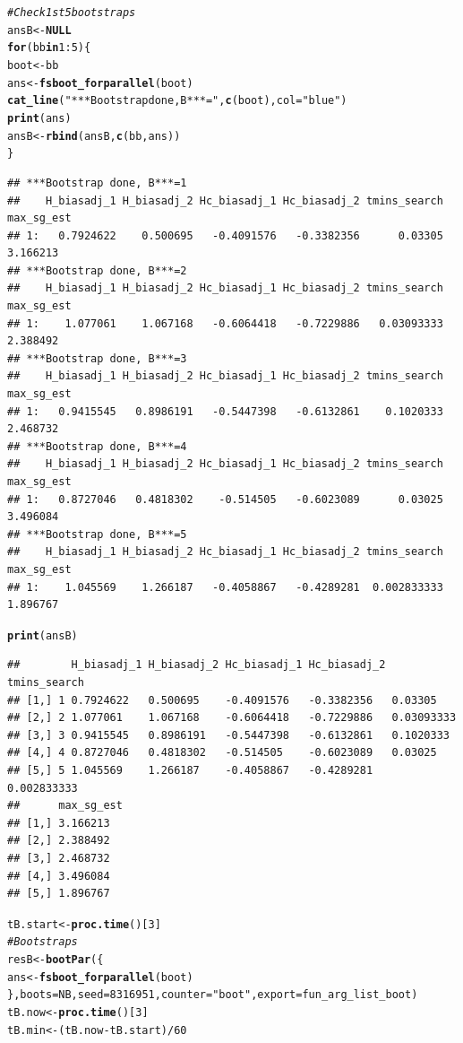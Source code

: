 \documentclass[12pt]{article}
\makeatletter
\newcommand{\hlnum}[1]{\textcolor[rgb]{0.686,0.059,0.569}{#1}}%
\newcommand{\hlstr}[1]{\textcolor[rgb]{0.192,0.494,0.8}{#1}}%
\newcommand{\hlcom}[1]{\textcolor[rgb]{0.678,0.584,0.686}{\textit{#1}}}%
\newcommand{\hlopt}[1]{\textcolor[rgb]{0,0,0}{#1}}%
\newcommand{\hlstd}[1]{\textcolor[rgb]{0.345,0.345,0.345}{#1}}%
\newcommand{\hlkwa}[1]{\textcolor[rgb]{0.161,0.373,0.58}{\textbf{#1}}}%
\newcommand{\hlkwb}[1]{\textcolor[rgb]{0.69,0.353,0.396}{#1}}%
\newcommand{\hlkwc}[1]{\textcolor[rgb]{0.333,0.667,0.333}{#1}}%
\newcommand{\hlkwd}[1]{\textcolor[rgb]{0.737,0.353,0.396}{\textbf{#1}}}%
\newenvironment{kframe}{%
 \def\at@end@of@kframe{}%
 \ifinner\ifhmode%
  \def\at@end@of@kframe{\end{minipage}}%
  \begin{minipage}{\columnwidth}%
 \fi\fi%
 \def\FrameCommand##1{\hskip\@totalleftmargin \hskip-\fboxsep
 \colorbox{shadecolor}{##1}\hskip-\fboxsep
     \hskip-\linewidth \hskip-\@totalleftmargin \hskip\columnwidth}%
 \MakeFramed {\advance\hsize-\width
   \@totalleftmargin\z@ \linewidth\hsize
   \@setminipage}}%
 {\par\unskip\endMakeFramed%
 \at@end@of@kframe}
\newenvironment{knitrout}{}{} %
\makeatother
\begin{document}
\begin{knitrout}
\begin{kframe}
\begin{alltt}
\hlcom{# Check 1st 5 bootstraps}
\hlstd{ansB} \hlkwb{<-} \hlkwa{NULL}
\hlkwa{for} \hlstd{(bb} \hlkwa{in} \hlnum{1}\hlopt{:}\hlnum{5}\hlstd{) \{}
    \hlstd{boot} \hlkwb{<-} \hlstd{bb}
    \hlstd{ans} \hlkwb{<-} \hlkwd{fsboot_forparallel}\hlstd{(boot)}
    \hlkwd{cat_line}\hlstd{(}\hlstr{"***Bootstrap done, B***="}\hlstd{,} \hlkwd{c}\hlstd{(boot),} \hlkwc{col} \hlstd{=} \hlstr{"blue"}\hlstd{)}
    \hlkwd{print}\hlstd{(ans)}
    \hlstd{ansB} \hlkwb{<-} \hlkwd{rbind}\hlstd{(ansB,} \hlkwd{c}\hlstd{(bb, ans))}
\hlstd{\}}
\end{alltt}
\begin{verbatim}
## ***Bootstrap done, B***=1
##    H_biasadj_1 H_biasadj_2 Hc_biasadj_1 Hc_biasadj_2 tmins_search max_sg_est
## 1:   0.7924622    0.500695   -0.4091576   -0.3382356      0.03305   3.166213
## ***Bootstrap done, B***=2
##    H_biasadj_1 H_biasadj_2 Hc_biasadj_1 Hc_biasadj_2 tmins_search max_sg_est
## 1:    1.077061    1.067168   -0.6064418   -0.7229886   0.03093333   2.388492
## ***Bootstrap done, B***=3
##    H_biasadj_1 H_biasadj_2 Hc_biasadj_1 Hc_biasadj_2 tmins_search max_sg_est
## 1:   0.9415545   0.8986191   -0.5447398   -0.6132861    0.1020333   2.468732
## ***Bootstrap done, B***=4
##    H_biasadj_1 H_biasadj_2 Hc_biasadj_1 Hc_biasadj_2 tmins_search max_sg_est
## 1:   0.8727046   0.4818302    -0.514505   -0.6023089      0.03025   3.496084
## ***Bootstrap done, B***=5
##    H_biasadj_1 H_biasadj_2 Hc_biasadj_1 Hc_biasadj_2 tmins_search max_sg_est
## 1:    1.045569    1.266187   -0.4058867   -0.4289281  0.002833333   1.896767
\end{verbatim}
\begin{alltt}
\hlkwd{print}\hlstd{(ansB)}
\end{alltt}
\begin{verbatim}
##        H_biasadj_1 H_biasadj_2 Hc_biasadj_1 Hc_biasadj_2 tmins_search
## [1,] 1 0.7924622   0.500695    -0.4091576   -0.3382356   0.03305     
## [2,] 2 1.077061    1.067168    -0.6064418   -0.7229886   0.03093333  
## [3,] 3 0.9415545   0.8986191   -0.5447398   -0.6132861   0.1020333   
## [4,] 4 0.8727046   0.4818302   -0.514505    -0.6023089   0.03025     
## [5,] 5 1.045569    1.266187    -0.4058867   -0.4289281   0.002833333 
##      max_sg_est
## [1,] 3.166213  
## [2,] 2.388492  
## [3,] 2.468732  
## [4,] 3.496084  
## [5,] 1.896767
\end{verbatim}
\begin{alltt}
\hlstd{tB.start} \hlkwb{<-} \hlkwd{proc.time}\hlstd{()[}\hlnum{3}\hlstd{]}
\hlcom{# Bootstraps}
\hlstd{resB} \hlkwb{<-} \hlkwd{bootPar}\hlstd{(\{}
    \hlstd{ans} \hlkwb{<-} \hlkwd{fsboot_forparallel}\hlstd{(boot)}
\hlstd{\},} \hlkwc{boots} \hlstd{= NB,} \hlkwc{seed} \hlstd{=} \hlnum{8316951}\hlstd{,} \hlkwc{counter} \hlstd{=} \hlstr{"boot"}\hlstd{,} \hlkwc{export} \hlstd{= fun_arg_list_boot)}
\hlstd{tB.now} \hlkwb{<-} \hlkwd{proc.time}\hlstd{()[}\hlnum{3}\hlstd{]}
\hlstd{tB.min} \hlkwb{<-} \hlstd{(tB.now} \hlopt{-} \hlstd{tB.start)}\hlopt{/}\hlnum{60}


\end{alltt}
\end{kframe}
\end{knitrout}
\end{document}
